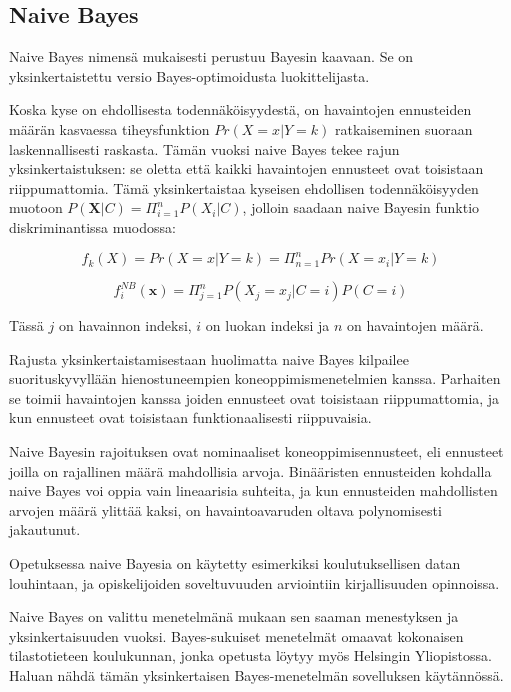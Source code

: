 \documentclass[finnish,twoside,openright]{HYgraduMLDS}
\begin{document}
\subsection{Naive Bayes}

Naive Bayes nimensä mukaisesti perustuu Bayesin kaavaan. Se on yksinkertaistettu versio Bayes-optimoidusta luokittelijasta\cite{rish2001empirical}.

Koska kyse on ehdollisesta todennäköisyydestä, on havaintojen ennusteiden määrän kasvaessa tiheysfunktion $Pr(X = x | Y = k)$ ratkaiseminen suoraan laskennallisesti raskasta. Tämän vuoksi naive Bayes tekee rajun yksinkertaistuksen: se oletta että kaikki havaintojen ennusteet ovat toisistaan riippumattomia. Tämä yksinkertaistaa kyseisen ehdollisen todennäköisyyden muotoon $P(\textbf{X}|C) = \Pi^n_{i=1} P(X_i | C)$, jolloin saadaan naive Bayesin funktio diskriminantissa muodossa:

\begin{equation}
    f_k(X) = Pr(X = x | Y = k) = \Pi^n_{n=1} Pr(X = x_i | Y = k)
\end{equation}

\begin{equation}
    f^{NB}_i(\textbf{x}) = \Pi^n_{j=1} P(X_j=x_j | C=i) P(C=i)
\end{equation}

Tässä $j$ on havainnon indeksi, $i$ on luokan indeksi ja $n$ on havaintojen määrä. 

Rajusta yksinkertaistamisestaan huolimatta naive Bayes kilpailee suorituskyvyllään hienostuneempien koneoppimismenetelmien kanssa\cite{rish2001empirical}. Parhaiten se toimii havaintojen kanssa joiden ennusteet ovat toisistaan riippumattomia, ja kun ennusteet ovat toisistaan funktionaalisesti riippuvaisia. 

Naive Bayesin rajoituksen ovat nominaaliset koneoppimisennusteet, eli ennusteet joilla on rajallinen määrä mahdollisia arvoja. Binääristen ennusteiden kohdalla naive Bayes voi oppia vain lineaarisia suhteita, ja kun ennusteiden mahdollisten arvojen määrä ylittää kaksi, on havaintoavaruden oltava polynomisesti jakautunut\cite{rish2001empirical}.

Opetuksessa naive Bayesia on käytetty esimerkiksi koulutuksellisen datan louhintaan\cite{bhardwaj2012data}, ja opiskelijoiden soveltuvuuden arviointiin kirjallisuuden opinnoissa\cite{hellas2018predicting}.

Naive Bayes on valittu menetelmänä mukaan sen saaman menestyksen ja yksinkertaisuuden vuoksi. Bayes-sukuiset menetelmät omaavat kokonaisen tilastotieteen koulukunnan, jonka opetusta löytyy myös Helsingin Yliopistossa. Haluan nähdä tämän yksinkertaisen Bayes-menetelmän sovelluksen käytännössä.
\end{document}
